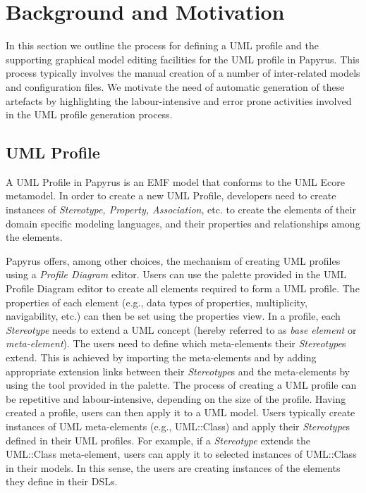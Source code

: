 \section{Background and Motivation}
\label{sec:background}

In this section we outline the process for defining a UML profile and the supporting graphical model editing facilities for the UML profile in Papyrus. 
This process typically involves the manual creation of a number of inter-related models and configuration files.
We motivate the need of automatic generation of these artefacts by highlighting the labour-intensive and error prone activities involved in the UML profile generation process.

\subsection{UML Profile}
A UML Profile in Papyrus is an EMF model that conforms to the UML Ecore metamodel. 
In order to create a new UML Profile, developers need to create instances of \textit{Stereotype, Property, Association}, etc. to create the elements of their domain specific modeling languages, and their properties and relationships among the elements.

Papyrus offers, among other choices, the mechanism of creating UML profiles using a \textit{Profile Diagram} editor. 
Users can use the palette provided in the UML Profile Diagram editor to create all elements required to form a UML profile.
The properties of each element (e.g., data types of properties, multiplicity, navigability, etc.) can then be set using the properties view. 
In a profile, each \textit{Stereotype} needs to extend a UML concept (hereby referred to as \textit{base element} or \textit{meta-element}). 
The users need to define which meta-elements their \textit{Stereotype}s extend. 
This is achieved by importing the meta-elements and by adding appropriate extension links between their \textit{Stereotype}s and the meta-elements by using the tool provided in the palette.
The process of creating a UML profile can be repetitive and labour-intensive, depending on the size of the profile.
Having created a profile, users can then apply it to a UML model. 
Users typically create instances of UML meta-elements (e.g., UML::Class) and apply their \textit{Stereotype}s defined in their UML profiles. 
For example, if a \textit{Stereotype} extends the UML::Class meta-element, users can apply it to selected instances of UML::Class in their models. 
In this sense, the users are creating instances of the elements they define in their DSLs. 

